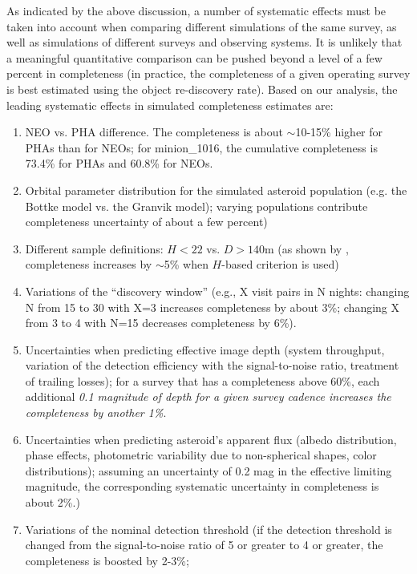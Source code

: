 As indicated by the above discussion, a number of systematic effects must be taken into account when
comparing different simulations of the same survey, as well as simulations of different surveys and observing 
systems. It is unlikely that a meaningful quantitative comparison can be pushed beyond a level of a few percent
in completeness (in practice, the completeness of a given operating survey is best estimated using the object 
re-discovery rate). Based on our analysis, the leading systematic effects in simulated completeness estimates are: 
\begin{enumerate}
\item NEO vs. PHA difference. The completeness is about $\sim$10-15\% higher for PHAs than for NEOs; 
for minion\_1016, the cumulative completeness is 73.4\% for PHAs and  60.8\% for NEOs. 
\item Orbital parameter distribution for the simulated asteroid population (e.g. the Bottke model
             vs. the Granvik model); varying populations contribute completeness uncertainty of about a few percent) 
\item Different sample definitions: $H<22$ vs. $D>140$m (as shown by \citealt{GMS2016}, completeness
           increases by $\sim$5\% when $H$-based criterion is used) 
\item Variations of the ``discovery window'' (e.g., X visit pairs in N nights: changing N from 15 to 30 with X=3 increases
          completeness by about 3\%; changing X from 3 to 4 with N=15 decreases completeness by 6\%). 
\item Uncertainties when predicting effective image depth (system throughput, variation of the detection efficiency
          with the signal-to-noise ratio, treatment of trailing losses); for a survey that has a completeness above 60\%, 
          each additional {\it 0.1 magnitude of depth for a given survey cadence increases the completeness by another 1\%}.
\item Uncertainties when predicting asteroid's apparent flux (albedo distribution, phase effects, photometric variability 
          due to non-spherical shapes, color distributions); assuming an uncertainty of 0.2 mag in the effective 
          limiting magnitude, the corresponding  systematic uncertainty in completeness is about 2\%.)
\item Variations of the nominal detection threshold (if the detection threshold is changed from the 
          signal-to-noise ratio of 5 or greater to 4 or greater, the completeness is boosted by 2-3\%; 

\end{enumerate}

